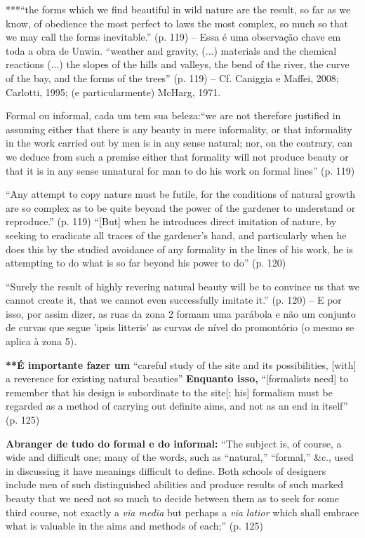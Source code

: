 \documentclass[12pt, a4paper]{book} %
\begin{document}
        ***``the forms which we find beautiful in wild nature are the result, so far as we know, of obedience the most perfect to laws the most complex, so much so that we may call the forms inevitable.'' (p. 119) – Essa é uma observação chave em toda a obra de Unwin.
        ``weather and gravity, (...) materials and the chemical reactions (...) the slopes of the hills and valleys, the bend of the river, the curve of the bay, and the forms of the trees'' (p. 119) – Cf. Caniggia e Maffei, 2008; Carlotti, 1995; (e particularmente) McHarg, 1971.

        Formal ou informal, cada um tem sua beleza:``we are not therefore justified in assuming either that there is any beauty in mere informality, or that informality in the work carried out by men is in any sense natural; nor, on the contrary, can we deduce from such a premise either that formality will not produce beauty or that it is in any sense unnatural for man to do his work on formal lines'' (p. 119)

        ``Any attempt to copy nature must be futile, for the conditions of natural growth are so complex as to be quite beyond the power of the gardener to understand or reproduce.'' (p. 119)
        ``[But] when he introduces direct imitation of nature, by seeking to eradicate all traces of the gardener's hand, and particularly when he does this by the studied avoidance of any formality in the lines of his work, he is attempting to do what is so far beyond his power to do'' (p. 120)

        ``Surely the result of highly revering natural beauty will be to convince us that we cannot create it, that we cannot even successfully imitate it.'' (p. 120) – E por isso, por assim dizer, as ruas da zona 2 formam uma parábola e não um conjunto de curvas que segue 'ipsis litteris' as curvas de nível do promontório (o mesmo se aplica à zona 5).

        \textbf{**É importante fazer um} ``careful study of the site and its possibilities, [with] a reverence for existing natural beauties''
        \textbf{Enquanto isso,} ``[formalists need] to remember that his design is subordinate to the site[; his] formalism must be regarded as a method of carrying out definite aims, and not as an end in itself'' (p. 125)

        \textbf{Abranger de tudo do formal e do informal:} ``The subject is, of course, a wide and difficult one; many of the words, such as “natural,” “formal,” &c., used in discussing it have meanings difficult to define. Both schools of designers include men of such distinguished abilities and produce results of such marked beauty that we need not so much to decide between them as to seek for some third course, not exactly a \textit{via media} but perhaps a \textit{via latior} which shall embrace what is valuable in the aims and methods of each;'' (p. 125)
\end{document}
